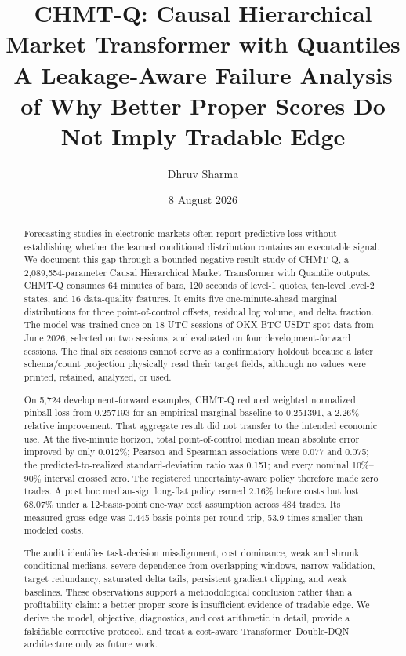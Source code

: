 \documentclass[10pt,letterpaper]{article}
\title{\textbf{CHMT-Q: Causal Hierarchical Market Transformer with Quantiles}\\
\large A Leakage-Aware Failure Analysis of Why Better Proper Scores Do Not
Imply Tradable Edge}
\author[1]{Dhruv Sharma}
\affil[1]{Independent Researcher\\texttt{dhruvsha.info@gmail.com}}
\date{8 August 2026}
\numberwithin{equation}{section}
\theoremstyle{definition}
\theoremstyle{remark}
\begin{document}
\maketitle

\begin{abstract}
Forecasting studies in electronic markets often report predictive loss without
establishing whether the learned conditional distribution contains an executable
signal. We document this gap through a bounded negative-result study of CHMT-Q, a
2,089,554-parameter Causal Hierarchical Market Transformer with Quantile outputs.
CHMT-Q consumes 64 minutes of bars, 120 seconds of level-1 quotes, ten-level
level-2 states, and 16 data-quality features. It emits five one-minute-ahead
marginal distributions for three point-of-control offsets, residual log volume,
and delta fraction. The model was trained once on 18 UTC sessions of OKX
BTC-USDT spot data from June 2026, selected on two sessions, and evaluated on
four development-forward sessions. The final six sessions cannot serve as a
confirmatory holdout because a later schema/count projection physically read
their target fields, although no values were printed, retained, analyzed, or
used.

On 5,724 development-forward examples, CHMT-Q reduced weighted normalized
pinball loss from 0.257193 for an empirical marginal baseline to 0.251391, a
2.26\% relative improvement. That aggregate result did not transfer to the
intended economic use. At the five-minute horizon, total point-of-control median
mean absolute error improved by only 0.012\%; Pearson and Spearman associations
were 0.077 and 0.075; the predicted-to-realized standard-deviation ratio was
0.151; and every nominal 10\%--90\% interval crossed zero. The registered
uncertainty-aware policy therefore made zero trades. A post hoc median-sign
long-flat policy earned 2.16\% before costs but lost 68.07\% under a
12-basis-point one-way cost assumption across 484 trades. Its measured gross
edge was 0.445 basis points per round trip, 53.9 times smaller than modeled
costs.

The audit identifies task-decision misalignment, cost dominance, weak and
shrunk conditional medians, severe dependence from overlapping windows, narrow
validation, target redundancy, saturated delta tails, persistent gradient
clipping, and weak baselines. These observations support a methodological
conclusion rather than a profitability claim: a better proper score is
insufficient evidence of tradable edge. We derive the model, objective,
diagnostics, and cost arithmetic in detail, provide a falsifiable corrective
protocol, and treat a cost-aware Transformer--Double-DQN architecture only as
future work.
\end{abstract}
\end{document}

